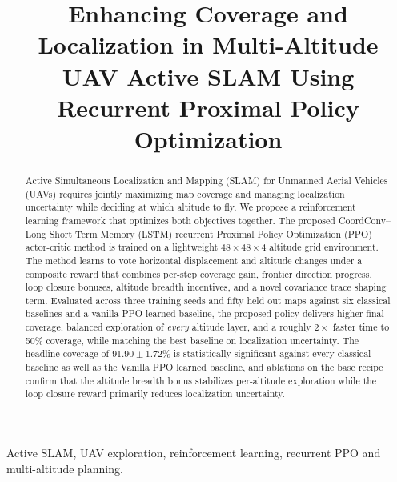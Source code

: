 \documentclass[conference]{IEEEtran}
\begin{document}
\title{\huge Enhancing Coverage and Localization in Multi-Altitude UAV Active SLAM Using Recurrent Proximal Policy Optimization}


\maketitle

\begin{abstract}
Active Simultaneous Localization and Mapping (SLAM) for Unmanned Aerial Vehicles (UAVs) requires jointly maximizing map coverage and managing localization uncertainty while deciding at which altitude to fly. We propose a reinforcement learning framework that optimizes both objectives together. The proposed CoordConv--Long Short Term Memory (LSTM) recurrent Proximal Policy Optimization (PPO) actor-critic method is trained on a lightweight $48{\times}48{\times}4$ altitude grid environment. The method learns to vote horizontal displacement and altitude changes under a composite reward that combines per-step coverage gain, frontier direction progress, loop closure bonuses, altitude breadth incentives, and a novel covariance trace shaping term. Evaluated across three training seeds and fifty held out maps against six classical baselines and a vanilla PPO learned baseline, the proposed policy delivers higher final coverage, balanced exploration of \emph{every} altitude layer, and a roughly $2{\times}$ faster time to 50\% coverage, while matching the best baseline on localization uncertainty. The headline coverage of $\mathbf{91.90 \pm 1.72\%}$ is statistically significant against every classical baseline as well as the Vanilla PPO learned baseline, and ablations on the base recipe confirm that the altitude breadth bonus stabilizes per-altitude exploration while the loop closure reward primarily reduces localization uncertainty.
\end{abstract}

\begin{IEEEkeywords}
Active SLAM, UAV exploration, reinforcement learning, recurrent PPO and multi-altitude planning.
\end{IEEEkeywords}

\end{document}
